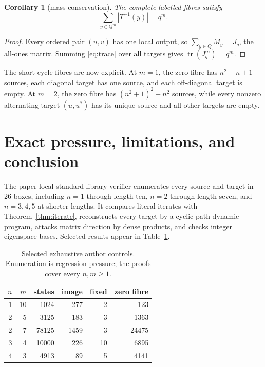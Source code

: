 \documentclass[a4paper,10pt]{amsart}
\newtheorem{corollary}[theorem]{Corollary}
\theoremstyle{remark}
\newcommand{\tr}{\operatorname{tr}}
\begin{document}
\begin{corollary}[mass conservation]\label{cor:mass}
The complete labelled fibres satisfy
\begin{equation}\label{eq:mass}
 \sum_{y\in Q^m}|T^{-1}(y)|=q^m.
\end{equation}
\end{corollary}

\begin{proof}
Every ordered pair $(u,v)$ has one local output, so $\sum_{y\in Q}M_y=J_q$,
the all-ones matrix.  Summing \eqref{eq:trace} over all targets gives
$\tr(J_q^m)=q^m$.
\end{proof}

The short-cycle fibres are now explicit.  At $m=1$, the zero fibre has
$n^2-n+1$ sources, each diagonal target has one source, and each off-diagonal
target is empty.  At $m=2$, the zero fibre has
$(n^2+1)^2-n^2$ sources, while every nonzero alternating target $(u,u^*)$
has its unique source and all other targets are empty.

\section{Exact pressure, limitations, and conclusion}

The paper-local standard-library verifier enumerates every source and target
in 26 boxes, including $n=1$ through length ten, $n=2$ through length seven,
and $n=3,4,5$ at shorter lengths.  It compares literal iterates with
Theorem~\ref{thm:iterate}, reconstructs every target by a cyclic path dynamic
program, attacks matrix direction by dense products, and checks integer
eigenspace bases.  Selected results appear in Table~\ref{tab:control}.

\begin{table}[h]
\centering
\small
\begin{tabular}{rrrrrr}
\hline
$n$&$m$&states&image&fixed&zero fibre\\
\hline
1&10&1024&277&2&123\\
2&5&3125&183&3&1363\\
2&7&78125&1459&3&24475\\
3&4&10000&226&10&6895\\
4&3&4913&89&5&4141\\
\hline
\end{tabular}
\caption{Selected exhaustive author controls.  Enumeration is regression
pressure; the proofs cover every $n,m\geq1$.}
\label{tab:control}
\end{table}
\end{document}
